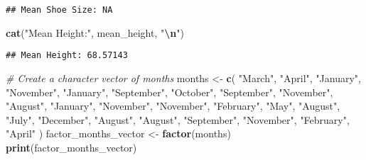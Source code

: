 \documentclass[
]{article}
\newenvironment{Shaded}{\begin{snugshade}}{\end{snugshade}}
\newcommand{\CommentTok}[1]{\textcolor[rgb]{0.56,0.35,0.01}{\textit{#1}}}
\newcommand{\FunctionTok}[1]{\textcolor[rgb]{0.13,0.29,0.53}{\textbf{#1}}}
\newcommand{\NormalTok}[1]{#1}
\newcommand{\OtherTok}[1]{\textcolor[rgb]{0.56,0.35,0.01}{#1}}
\newcommand{\SpecialCharTok}[1]{\textcolor[rgb]{0.81,0.36,0.00}{\textbf{#1}}}
\newcommand{\StringTok}[1]{\textcolor[rgb]{0.31,0.60,0.02}{#1}}
\begin{document}
\begin{Shaded}
\end{Shaded}

\begin{verbatim}
## Mean Shoe Size: NA
\end{verbatim}

\begin{Shaded}
\begin{Highlighting}[]
\FunctionTok{cat}\NormalTok{(}\StringTok{"Mean Height:"}\NormalTok{, mean\_height, }\StringTok{"}\SpecialCharTok{\textbackslash{}n}\StringTok{"}\NormalTok{)}
\end{Highlighting}
\end{Shaded}

\begin{verbatim}
## Mean Height: 68.57143
\end{verbatim}

\begin{Shaded}
\begin{Highlighting}[]
\CommentTok{\# Create a character vector of months}
\NormalTok{months }\OtherTok{\textless{}{-}} \FunctionTok{c}\NormalTok{(}
  \StringTok{"March"}\NormalTok{, }\StringTok{"April"}\NormalTok{, }\StringTok{"January"}\NormalTok{, }\StringTok{"November"}\NormalTok{, }\StringTok{"January"}\NormalTok{,}
  \StringTok{"September"}\NormalTok{, }\StringTok{"October"}\NormalTok{, }\StringTok{"September"}\NormalTok{, }\StringTok{"November"}\NormalTok{, }\StringTok{"August"}\NormalTok{,}
  \StringTok{"January"}\NormalTok{, }\StringTok{"November"}\NormalTok{, }\StringTok{"November"}\NormalTok{, }\StringTok{"February"}\NormalTok{, }\StringTok{"May"}\NormalTok{, }\StringTok{"August"}\NormalTok{,}
  \StringTok{"July"}\NormalTok{, }\StringTok{"December"}\NormalTok{, }\StringTok{"August"}\NormalTok{, }\StringTok{"August"}\NormalTok{, }\StringTok{"September"}\NormalTok{, }\StringTok{"November"}\NormalTok{, }\StringTok{"February"}\NormalTok{, }\StringTok{"April"}
\NormalTok{)}
\NormalTok{factor\_months\_vector }\OtherTok{\textless{}{-}} \FunctionTok{factor}\NormalTok{(months)}
\FunctionTok{print}\NormalTok{(factor\_months\_vector)}
\end{Highlighting}
\end{Shaded}
\end{document}
